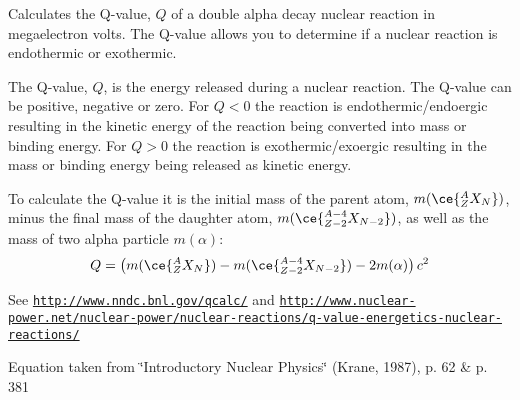 Calculates the Q-\/value, $Q$ of a double alpha decay nuclear reaction in megaelectron volts. The Q-\/value allows you to determine if a nuclear reaction is endothermic or exothermic. 

The Q-\/value, $Q$, is the energy released during a nuclear reaction. The Q-\/value can be positive, negative or zero. For $Q < 0$ the reaction is endothermic/endoergic resulting in the kinetic energy of the reaction being converted into mass or binding energy. For $Q > 0$ the reaction is exothermic/exoergic resulting in the mass or binding energy being released as kinetic energy.

To calculate the Q-\/value it is the initial mass of the parent atom, $m(\ce{ ^{A}_{Z}X_{N} })$, minus the final mass of the daughter atom, $m(\ce{ ^{A-4}_{Z-2}X_{N-2} })$, as well as the mass of two alpha particle $m(\alpha)$\+: \[Q = \left ( m(\ce{ ^{A}_{Z}X_{N} })-m(\ce{ ^{A-4}_{Z-2}X_{N-2} })-2m(\alpha) \right) c^2\]

See \href{http://www.nndc.bnl.gov/qcalc/}{\tt http\+://www.\+nndc.\+bnl.\+gov/qcalc/} and \href{http://www.nuclear-power.net/nuclear-power/nuclear-reactions/q-value-energetics-nuclear-reactions/}{\tt http\+://www.\+nuclear-\/power.\+net/nuclear-\/power/nuclear-\/reactions/q-\/value-\/energetics-\/nuclear-\/reactions/}

Equation taken from \char`\"{}\+Introductory Nuclear Physics\char`\"{} (Krane, 1987), p. 62 \& p. 381


